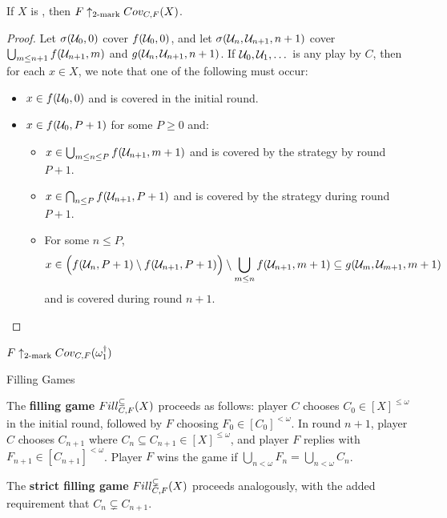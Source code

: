   \begin{theorem}
    If $X$ is \scish, then $F \uparrow_{2\text{-mark}}Cov_{C,F}(X)$.
  \end{theorem}

  \begin{proof}
    Let $\sigma(\mathcal{U}_0,0)$ cover $f(\mathcal{U}_0,0)$, and let $\sigma(\mathcal{U}_n,\mathcal{U}_{n+1},n+1)$ cover $\bigcup_{m\leq n+1}f(\mathcal{U}_{n+1},m)$ and $g(\mathcal{U}_n,\mathcal{U}_{n+1},n+1)$. If $\mathcal{U}_0,\mathcal{U}_1,\dots$ is any play by $C$, then for each $x\in X$, we note that one of the following must occur:
      \begin{itemize}
        \item $x \in f(\mathcal{U}_0,0)$ and is covered in the initial round.
        \item $x \in f(\mathcal{U}_0,P+1)$ for some $P\geq 0$ and:
        \begin{itemize}
          \item $x\in \bigcup_{m\leq n\leq P} f(\mathcal{U}_{n+1},m+1)$ and is covered by the strategy by round $P+1$.
          \item $x\in \bigcap_{n\leq P} f(\mathcal{U}_{n+1},P+1)$ and is covered by the strategy during round $P+1$.
          \item For some $n \leq P$, 
            \[x \in \Big( f(\mathcal{U}_{n},P+1)\setminus f(\mathcal{U}_{n+1},P+1) \Big)\setminus \bigcup_{m\leq n} f(\mathcal{U}_{n+1},m+1) \subseteq g(\mathcal{U}_m,\mathcal{U}_{m+1},m+1)\]
           and is covered during round $n+1$.
         \end{itemize}
      \end{itemize}
  \end{proof}

  \begin{corollary}
    $F\uparrow_{2\text{-mark}}Cov_{C,F}(\omega_1^\dagger)$
  \end{corollary}


\newpage

  \centerline{Filling Games}

  \begin{definition}
    The \textbf{filling game} $Fill^{\subseteq}_{C,F}(X)$ proceeds as follows: player $C$ chooses $C_0\in[X]^{\leq\omega}$ in the initial round, followed by $F$ choosing $F_0\in[C_0]^{<\omega}$. In round $n+1$, player $C$ chooses $C_{n+1}$ where $C_n\subseteq C_{n+1}\in[X]^{\leq\omega}$, and player $F$ replies with $F_{n+1}\in[C_{n+1}]^{<\omega}$. Player $F$ wins the game if $\bigcup_{n<\omega} F_n = \bigcup_{n<\omega} C_n$.

    The \textbf{strict filling game} $Fill^{\subsetneq}_{C,F}(X)$ proceeds analogously, with the added requirement that $C_n\subsetneq C_{n+1}$.
  \end{definition}

